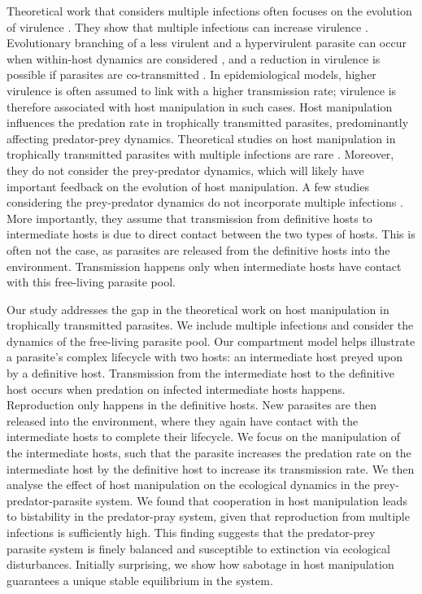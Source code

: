 \documentclass[11pt]{article}
\begin{document}
Theoretical work that considers multiple infections often focuses on the evolution of virulence \citep{vanBaalen1995, Alizon2013, Alizon2008, Choisy2010, Alizon2012}. 
They show that multiple infections can increase virulence \citep{vanBaalen1995, Choisy2010}.
Evolutionary branching of a less virulent and a hypervirulent parasite can occur when within-host dynamics are considered \citep{ Alizon2008}, and a reduction in virulence is possible if parasites are co-transmitted \citep{Alizon2012}. 
In epidemiological models, higher virulence is often assumed to link with a higher transmission rate; virulence is therefore associated with host manipulation in such cases. 
Host manipulation influences the predation rate in trophically transmitted parasites, predominantly affecting predator-prey dynamics. 
Theoretical studies on host manipulation in trophically transmitted parasites with multiple infections are rare \citep{Parker2003,Vickery2009}. Moreover, they do not consider the prey-predator dynamics, which will likely have important feedback on the evolution of host manipulation. 
A few studies considering the prey-predator dynamics do not incorporate multiple infections \citep{Rogawa2018, Iritani2018, Hadeler1989, Fenton2006}. 
More importantly, they assume that transmission from definitive hosts to intermediate hosts is due to direct contact between the two types of hosts. 
This is often not the case, as parasites are released from the definitive hosts into the environment. 
Transmission happens only when intermediate hosts have contact with this free-living parasite pool.

Our study addresses the gap in the theoretical work on host manipulation in trophically transmitted parasites.
We include multiple infections and consider the dynamics of the free-living parasite pool. 
Our compartment model helps illustrate a parasite's complex lifecycle with two hosts: an intermediate host preyed upon by a definitive host. 
Transmission from the intermediate host to the definitive host occurs when predation on infected intermediate hosts happens. 
Reproduction only happens in the definitive hosts. 
New parasites are then released into the environment, where they again have contact with the intermediate hosts to complete their lifecycle. 
We focus on the manipulation of the intermediate hosts, such that the parasite increases the predation rate on the intermediate host by the definitive host to increase its transmission rate. 
We then analyse the effect of host manipulation on the ecological dynamics in the prey-predator-parasite system. 
We found that cooperation in host manipulation leads to bistability in the predator-pray system, given that reproduction from multiple infections is sufficiently high. 
This finding suggests that the predator-prey parasite system is finely balanced and susceptible to extinction via ecological disturbances.
Initially surprising, we show how sabotage in host manipulation guarantees a unique stable equilibrium in the system. 
\end{document}
